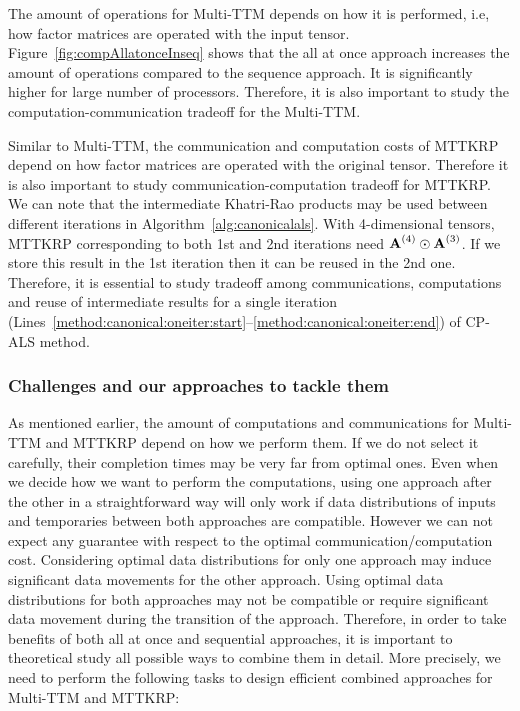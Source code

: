 \documentclass[a4paper,11pt]{article}
\begin{document}
	
	
	
	The amount of operations for Multi-TTM depends on how it is performed, i.e, how factor matrices are operated with the input tensor. Figure~\ref{fig:compAllatonceInseq} shows that the all at once approach increases the amount of operations compared to the sequence approach. It is significantly higher for large number of processors. Therefore, it is also important to study the computation-communication tradeoff for the Multi-TTM. 
	
	
	
%	
	
	Similar to Multi-TTM, the communication and computation costs of MTTKRP depend on how factor matrices are operated with the original tensor. Therefore it is also important to study communication-computation tradeoff for MTTKRP. We can note that the intermediate Khatri-Rao products may be used between different iterations in Algorithm~\ref{alg:canonicalals}. With 4-dimensional tensors, MTTKRP corresponding to both 1st and 2nd iterations need $\Mn{A}{4}\odot\Mn{A}{3}$. If we store this result in the 1st iteration then it can be reused in the 2nd one. Therefore, it is essential to study tradeoff among communications, computations and reuse of intermediate results for a single iteration (Lines~\ref{method:canonical:oneiter:start}--\ref{method:canonical:oneiter:end}) of CP-ALS method.
	
	
	
	\subsubsection{Challenges and our approaches to tackle them}
	
	As mentioned earlier, the amount of computations and communications for Multi-TTM and MTTKRP  depend on how we perform them. If we do not select it carefully, their completion times may be very far from optimal ones. Even when we decide how we want to perform the computations,  using one approach after the other in a straightforward way will only work if data distributions of inputs and temporaries between both approaches are compatible. However we can not expect any guarantee with respect to the optimal communication/computation cost.  Considering optimal data distributions for only one approach may induce significant data movements  for the other approach. Using optimal data distributions for both approaches may not be compatible or require significant data movement during the transition of the approach. Therefore, in order to take benefits of both all at once and sequential approaches, it is important to theoretical study all possible ways to combine them in detail. More precisely, we need to perform the following tasks to design efficient combined approaches for Multi-TTM and MTTKRP:
	
\end{document}
